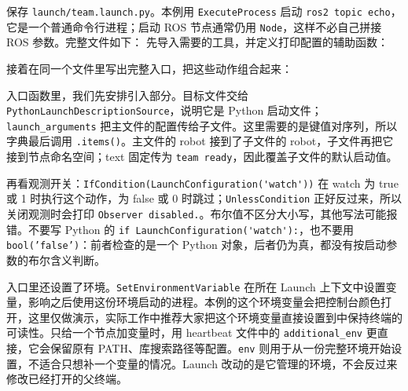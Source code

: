 \begin{example}[按条件观测一条消息]
保存 \nolinkurl{launch/team.launch.py}。本例用 \texttt{ExecuteProcess} 启动 \texttt{ros2 topic echo}，它是一个普通命令行进程；启动 ROS 节点通常仍用 \texttt{Node}，这样不必自己拼接 ROS 参数。完整文件如下：
先导入需要的工具，并定义打印配置的辅助函数：
\par\medskip\noindent\begin{minipage}{\linewidth}

\end{minipage}\par\smallskip

接着在同一个文件里写出完整入口，把这些动作组合起来：
\par\medskip\noindent\begin{minipage}{\linewidth}

\end{minipage}\par\smallskip

入口函数里，我们先安排引入部分。目标文件交给 \nolinkurl{PythonLaunchDescriptionSource}，说明它是 Python 启动文件；\texttt{launch\_arguments} 把主文件的配置传给子文件。这里需要的是键值对序列，所以字典最后调用 \texttt{.items()}。主文件的 robot 接到了子文件的 robot，子文件再把它接到节点命名空间；text 固定传为 \texttt{team ready}，因此覆盖子文件的默认启动值。

再看观测开关：\nolinkurl{IfCondition(LaunchConfiguration('watch'))} 在 watch 为 true 或 1 时执行这个动作，为 false 或 0 时跳过；\texttt{UnlessCondition} 正好反过来，所以关闭观测时会打印 \texttt{Observer disabled.}。布尔值不区分大小写，其他写法可能报错。不要写 Python 的 \nolinkurl{if LaunchConfiguration('watch'):}，也不要用 \texttt{bool('false')}：前者检查的是一个 Python 对象，后者仍为真，都没有按启动参数的布尔含义判断。

入口里还设置了环境。\nolinkurl{SetEnvironmentVariable} 在所在 Launch 上下文中设置变量，影响之后使用这份环境启动的进程。本例的这个环境变量会把控制台颜色打开，这里仅做演示，实际工作中推荐大家把这个环境变量直接设置到中保持终端的可读性。只给一个节点加变量时，用 heartbeat 文件中的 \texttt{additional\_env} 更直接，它会保留原有 PATH、库搜索路径等配置。\texttt{env} 则用于从一份完整环境开始设置，不适合只想补一个变量的情况。Launch 改动的是它管理的环境，不会反过来修改已经打开的父终端。


\end{example}
